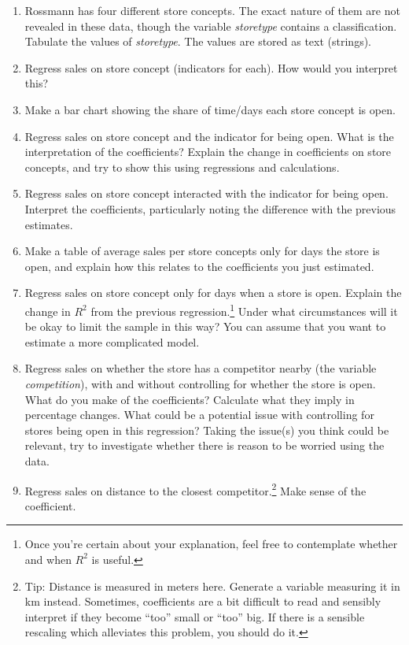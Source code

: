 \documentclass[12pt,a4paper]{article}
\begin{document}
\begin{enumerate}
\item Rossmann has four different store concepts. The exact nature of them are not revealed in these data, though the variable \emph{storetype} contains a classification. Tabulate the values of \emph{storetype}. The values are stored as text (strings).
\item Regress sales on store concept (indicators for each). How would you interpret this?
\item Make a bar chart showing the share of time/days each store concept is open.
\item Regress sales on store concept and the indicator for being open. What is the interpretation of the coefficients? Explain the change in coefficients on store concepts, and try to show this using regressions and calculations.
\item Regress sales on store concept interacted with the indicator for being open. Interpret the coefficients, particularly noting the difference with the previous estimates.
\item Make a table of average sales per store concepts only for days the store is open, and explain how this relates to the coefficients you just estimated.
\item Regress sales on store concept only for days when a store is open. Explain the change in $R^2$ from the previous regression.\footnote{Once you're certain about your explanation, feel free to contemplate whether and when $R^2$ is useful.} Under what circumstances will it be okay to limit the sample in this way? You can assume that you want to estimate a more complicated model.
\item Regress sales on whether the store has a competitor nearby (the variable \emph{competition}), with and without controlling for whether the store is open. What do you make of the coefficients? Calculate what they imply in percentage changes. What could be a potential issue with controlling for stores being open in this regression? Taking the issue(s) you think could be relevant, try to investigate whether there is reason to be worried using the data.
\item Regress sales on distance to the closest competitor.\footnote{Tip: Distance is measured in meters here. Generate a variable measuring it in km instead. Sometimes, coefficients are a bit difficult to read and sensibly interpret if they become ``too'' small or ``too'' big. If there is a sensible rescaling which alleviates this problem, you should do it.} Make sense of the coefficient.

\end{enumerate}
\end{document}
